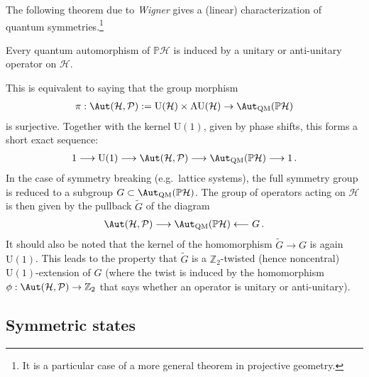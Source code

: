     The following theorem due to \textit{Wigner} gives a (linear) characterization of quantum symmetries.\footnote{It is a particular case of a more general theorem in projective geometry.}
    \begin{theorem}[Wigner]
        Every quantum automorphism of $\mathbb{P}\mathcal{H}$ is induced by a unitary or anti-unitary operator on $\mathcal{H}$.
    \end{theorem}
    This is equivalent to saying that the group morphism
    \begin{gather}
        \pi:\Aut(\mathcal{H},\mathcal{P}):=\mathrm{U}(\mathcal{H})\times\mathrm{AU}(\mathcal{H})\rightarrow\Aut_{\text{QM}}(\mathbb{P}\mathcal{H})
    \end{gather}
    is surjective. Together with the kernel $\mathrm{U}(1)$, given by phase shifts, this forms a short exact sequence:
    \begin{gather}
        1\longrightarrow\mathrm{U}(1)\longrightarrow\Aut(\mathcal{H},\mathcal{P})\longrightarrow\Aut_{\text{QM}}(\mathbb{P}\mathcal{H})\longrightarrow1\,.
    \end{gather}
    In the case of symmetry breaking (e.g.~lattice systems), the full symmetry group is reduced to a subgroup $G\subset\Aut_{\text{QM}}(\mathbb{P}\mathcal{H})$. The group of operators acting on $\mathcal{H}$ is then given by the pullback $\widetilde{G}$ of the diagram
    \begin{gather}
        \Aut(\mathcal{H},\mathcal{P})\longrightarrow\Aut_{\text{QM}}(\mathbb{P}\mathcal{H})\longleftarrow G\,.
    \end{gather}
    It should also be noted that the kernel of the homomorphism $\widetilde{G}\rightarrow G$ is again $\mathrm{U}(1)$. This leads to the property that $\widetilde{G}$ is a $\mathbb{Z}_2$-twisted (hence noncentral) $\mathrm{U}(1)$-extension of $G$ (where the twist is induced by the homomorphism $\phi:\Aut(\mathcal{H},\mathcal{P})\rightarrow\mathbb{Z}_2$ that says whether an operator is unitary or anti-unitary).


\subsection{Symmetric states}

